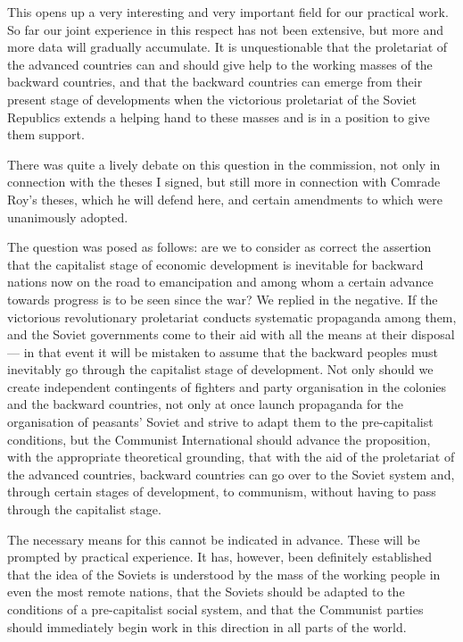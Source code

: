 This opens up a very interesting and very important field for our practical work. So far our joint experience in this respect has not been extensive, but more and more data will gradually accumulate. It is unquestionable that the proletariat of the advanced countries can and should give help to the working masses of the backward countries, and that the backward countries can emerge from their present stage of developments when the victorious proletariat of the Soviet Republics extends a helping hand to these masses and is in a position to give them support. 

There was quite a lively debate on this question in the commission, not only in connection with the theses I signed, but still more in connection with Comrade Roy’s theses, which he will defend here, and certain amendments to which were unanimously adopted. 

The question was posed as follows: are we to consider as correct the assertion that the capitalist stage of economic development is inevitable for backward nations now on the road to emancipation and among whom a certain advance towards progress is to be seen since the war? We replied in the negative. If the victorious revolutionary proletariat conducts systematic propaganda among them, and the Soviet governments come to their aid with all the means at their disposal — in that event it will be mistaken to assume that the backward peoples must inevitably go through the capitalist stage of development. Not only should we create independent contingents of fighters and party organisation in the colonies and the backward countries, not only at once launch propaganda for the organisation of peasants' Soviet and strive to adapt them to the pre-capitalist conditions, but the Communist International should advance the proposition, with the appropriate theoretical grounding, that with the aid of the proletariat of the advanced countries, backward countries can go over to the Soviet system and, through certain stages of development, to communism, without having to pass through the capitalist stage. 

The necessary means for this cannot be indicated in advance. These will be prompted by practical experience. It has, however, been definitely established that the idea of the Soviets is understood by the mass of the working people in even the most remote nations, that the Soviets should be adapted to the conditions of a pre-capitalist social system, and that the Communist parties should immediately begin work in 
this direction in all parts of the world. 

